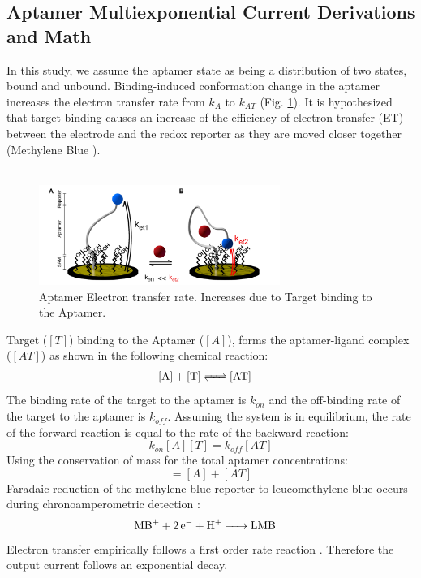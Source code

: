 \begin{appendices}
\section{Aptamer Multiexponential Current Derivations and Math}
\label{Aptamer_multiexp}
In this study, we assume the aptamer state as being a distribution of two states, bound and unbound. Binding-induced conformation change in the aptamer increases the electron transfer rate from $k_{A}$ to $k_{AT}$ (Fig. \ref{aptamerrate}). It is hypothesized that target binding causes an
increase of the efficiency of electron transfer (ET) between the
electrode and the redox reporter as they are moved closer together \cite{farjami2011off} (Methylene Blue \cite{arroyo2018subsecond}).\\\\
\begin{figure}[H]
    \centering
    \includegraphics[width = 0.7\textwidth]{img/aptamerdiagram2.png}
    \caption{Aptamer Electron transfer rate. Increases due to Target binding to the Aptamer.\cite{arroyo2018subsecond}}
    \label{aptamerrate}
\end{figure}
Target ($[T]$) binding to the Aptamer ($[A]$), forms the aptamer-ligand complex ($[AT]$) as shown in the following chemical reaction:
\begin{align}
\cee{[A] + [T]  &<=> [AT]} 
\end{align}
The binding rate of the target to the aptamer is $k_{on}$ and the off-binding rate of the target to the aptamer is $k_{off}$. Assuming the system is in equilibrium, the rate of the forward reaction is equal to the rate of the backward reaction:
\begin{equation}
k_{on}[A][T] = k_{off}[AT]
\end{equation}
Using the conservation of mass for the total aptamer concentrations:
\begin{equation}
[A_{0}] = [A] + [AT]
\end{equation}
Faradaic reduction of the methylene blue reporter to leucomethylene blue occurs during chronoamperometric detection
 \cite{zhan1990mechanisms}:
\begin{align}
\cee{MB^{+} + 2e^{-} + H^{+}  &-> LMB} 
\end{align}
Electron transfer empirically follows a first order rate reaction \cite{bard1983electrochemical, forster1994electrochemistry}. Therefore the output current follows an exponential decay.


\end{appendices}
